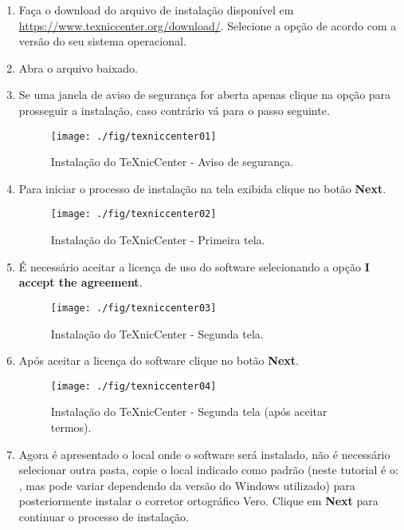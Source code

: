 \begin{enumerate}
\item Faça o download do arquivo de instalação disponível em \url{https://www.texniccenter.org/download/}. Selecione a opção de acordo com a versão do seu sistema operacional. 
\item Abra o arquivo baixado.
\item Se uma janela de aviso de segurança for aberta apenas clique na opção  para prosseguir a instalação, caso contrário vá para o passo seguinte.
\begin{figure}[H]
  \centering
  \texttt{[image: ./fig/texniccenter01]}
  \caption{Instalação do TeXnicCenter - Aviso de segurança.}
\end{figure}
\item Para iniciar o processo de instalação na tela exibida clique no botão \textbf{Next}.
\begin{figure}[H]
  \centering
  \texttt{[image: ./fig/texniccenter02]}
  \caption{Instalação do TeXnicCenter - Primeira tela.}
\end{figure}
\item É necessário aceitar a licença de uso do software selecionando a opção \textbf{I accept the agreement}.
\begin{figure}[H]
  \centering
  \texttt{[image: ./fig/texniccenter03]}
  \caption{Instalação do TeXnicCenter - Segunda tela.}
\end{figure}
\item Após aceitar a licença do software clique no botão \textbf{Next}.
\begin{figure}[H]
  \centering
  \texttt{[image: ./fig/texniccenter04]}
  \caption[Segunda tela (após aceitar termos)]{Instalação do TeXnicCenter - Segunda tela (após aceitar termos).}
\end{figure}
\item Agora é apresentado o local onde o software será instalado, não é necessário selecionar outra pasta, copie o local indicado como padrão (neste tutorial é o: , mas pode variar dependendo da versão do Windows utilizado) para posteriormente instalar o corretor ortográfico Vero. Clique em \textbf{Next} para continuar o processo de instalação.
\begin{figure}[H]
  \centering

\end{figure}
\end{enumerate}
